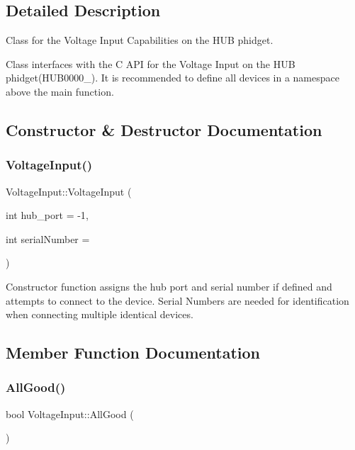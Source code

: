 \subsection{Detailed Description}
Class for the Voltage Input Capabilities on the H\+UB phidget. 

Class interfaces with the C A\+PI for the Voltage Input on the H\+UB phidget(\+H\+U\+B0000\+\_). It is recommended to define all devices in a namespace above the main function. 

\subsection{Constructor \& Destructor Documentation}
\mbox{\label{classVoltageInput_afaba264bd65b8552d34200eabb8b007b}} 
\subsubsection{\texorpdfstring{Voltage\+Input()}{VoltageInput()}}
{\footnotesize\ttfamily Voltage\+Input\+::\+Voltage\+Input (\begin{DoxyParamCaption}\item[{int}]{hub\+\_\+port = {\ttfamily -\/1},  }\item[{int}]{serial\+Number = {} }\end{DoxyParamCaption})\hspace{0.3cm}{\ttfamily [inline]}}

Constructor function assigns the hub port and serial number if defined and attempts to connect to the device. Serial Numbers are needed for identification when connecting multiple identical devices.

\subsection{Member Function Documentation}
\mbox{\label{classVoltageInput_a35098eab2841bccd497184bc541d7fdf}} 
\subsubsection{\texorpdfstring{All\+Good()}{AllGood()}}
{\footnotesize\ttfamily bool Voltage\+Input\+::\+All\+Good (\begin{DoxyParamCaption}{ }\end{DoxyParamCaption})\hspace{0.3cm}{\ttfamily [inline]}}

